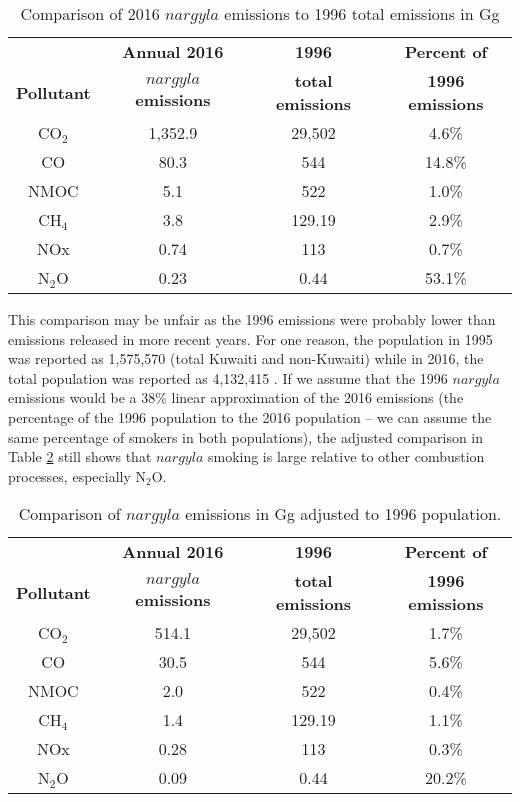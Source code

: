 %
\begin{table}[]
\centering
\caption{Comparison of 2016 $nargyla$ emissions to 1996 total emissions in Gg}
\label{tb8:comparison}
\begin{tabular}{@{}cccc@{}}
\toprule
 & \textbf{Annual 2016} & \textbf{1996} & \textbf{Percent of} \\
\textbf{Pollutant} & \textbf{$nargyla$ emissions} & \textbf{total emissions} & \textbf{1996 emissions} \\ \midrule
CO$_{2}$ & 1,352.9 & 29,502 & 4.6\% \\
CO & 80.3 & 544 & 14.8\% \\
NMOC & 5.1 & 522 & 1.0\% \\
CH$_{4}$ & 3.8 & 129.19 & 2.9\% \\
NOx & 0.74 & 113 & 0.7\% \\
N$_{2}$O & 0.23 & 0.44 & 53.1\% \\ \bottomrule
\end{tabular}
\end{table}

This comparison may be unfair as the 1996 emissions were probably lower than emissions released in more recent years.  For one reason, the population in 1995 was reported as 1,575,570 (total Kuwaiti and non-Kuwaiti) while in 2016, the total population was reported as 4,132,415 \citep{CSB2017}.  If we assume that the 1996 $nargyla$ emissions would be a 38\% linear approximation of the 2016 emissions (the percentage of the 1996 population to the 2016 population – we can assume the same percentage of smokers in both populations), the adjusted comparison in Table \ref{tb9:adjusted} still shows that $nargyla$ smoking is large relative to other combustion processes, especially N$_{2}$O.
%
\begin{table}[]
\centering
\caption{Comparison of $nargyla$ emissions in Gg adjusted to 1996 population.}
\label{tb9:adjusted}
\begin{tabular}{@{}cccc@{}}
\toprule
 & \textbf{Annual 2016} & \textbf{1996} & \textbf{Percent of} \\
\textbf{Pollutant} & \textbf{$nargyla$ emissions} & \textbf{total emissions} & \textbf{1996 emissions} \\ \midrule
CO$_{2}$ & 514.1 & 29,502 & 1.7\% \\
CO & 30.5 & 544 & 5.6\% \\
NMOC & 2.0 & 522 & 0.4\% \\
CH$_{4}$ & 1.4 & 129.19 & 1.1\% \\
NOx & 0.28 & 113 & 0.3\% \\
N$_{2}$O & 0.09 & 0.44 & 20.2\% \\ \bottomrule
\end{tabular}
\end{table}
\clearpage
